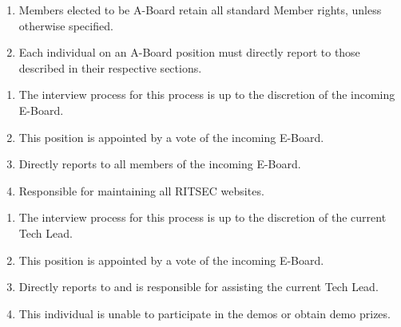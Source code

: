 

\begin{enumerate}
  \item Members elected to be A-Board retain all standard Member rights, unless otherwise specified. 
  \item Each individual on an A-Board position must directly report to those described in their respective sections. 
\end{enumerate}


\begin{enumerate}
  \item The interview process for this process is up to the discretion of the incoming E-Board. 
  \item This position is appointed by a vote of the incoming E-Board.
  \item Directly reports to all members of the incoming E-Board. 
  \item Responsible for maintaining all RITSEC websites.
\end{enumerate}


\begin{enumerate}
  \item The interview process for this process is up to the discretion of the current Tech Lead.
  \item This position is appointed by a vote of the incoming E-Board.
  \item Directly reports to and is responsible for assisting the current Tech Lead.
  \item This individual is unable to participate in the demos or obtain demo prizes.
\end{enumerate}